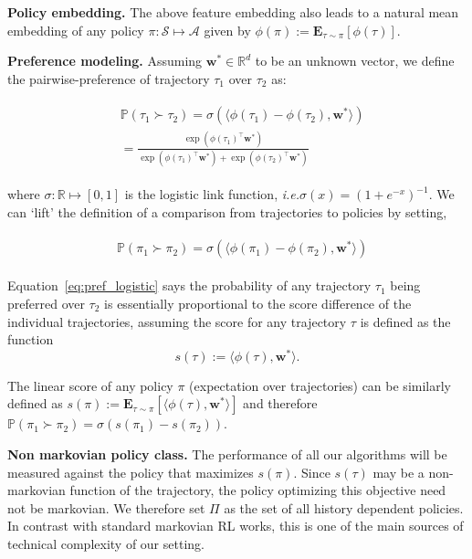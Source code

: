 \textbf{Policy embedding.} The above feature embedding also leads to a natural mean embedding of any policy $\pi: {\mathcal S} \mapsto {\mathcal A}$ given by $\phi(\pi):={\mathbf E}_{\tau \sim \pi}[\phi(\tau)]$.

\textbf{Preference modeling.} Assuming ${\mathbf w}^* \in {\mathbb R}^d$ to be an unknown vector, we define the pairwise-preference of trajectory $\tau_1$ over $\tau_2$ as:

\begin{align}
\begin{split}
\label{eq:pref_logistic}
 & \mathbb{P}( \tau_1 \succ  \tau_2 )  = \sigma( \langle \phi(\tau_1) - \phi(\tau_2), {\mathbf w}^* \rangle )  \\
 & = \frac{\exp(\phi(\tau_1)^\top {\mathbf w}^*)}{\exp(\phi(\tau_1)^\top {\mathbf w}^*) + \exp(\phi(\tau_2)^\top {\mathbf w}^*)} 
 \end{split}
\end{align}

where $\sigma: {\mathbb R} \mapsto [0,1]$ is the logistic link function, \emph{i.e.}$\sigma(x) = (1+e^{-x})^{-1}$. We can `lift' the definition of a comparison from trajectories to policies by setting,

\begin{align}
\begin{split}
\label{eq:pref_logistic_policies}
 & \mathbb{P}( \pi_1 \succ  \pi_2 )  = \sigma( \langle \phi(\pi_1) - \phi(\pi_2), {\mathbf w}^* \rangle ) 
 \end{split}
\end{align}

Equation~\ref{eq:pref_logistic} says the probability of any trajectory $\tau_1$ being preferred over $\tau_2$ is essentially proportional to the score difference of the individual trajectories, assuming the score for any trajectory $\tau$ is defined as the function \[s(\tau):= \langle \phi(\tau),{\mathbf w}^*\rangle.\] 

The linear score of any policy $\pi$ (expectation over trajectories) can be similarly defined as $s(\pi):= {\mathbf E}_{\tau \sim \pi}[\langle \phi(\tau),{\mathbf w}^*\rangle]$ and therefore $\mathbb{P}( \pi_1 \succ  \pi_2  ) = \sigma(  s(\pi_1) - s(\pi_2))$.

\textbf{Non markovian policy class. }The performance of all our algorithms will be measured against the policy that maximizes $s(\pi)$. Since $s(\tau) $ may be a non-markovian function of the trajectory, the policy optimizing this objective need not be markovian. We therefore set $\Pi$ as the set of all history dependent policies. In contrast with standard markovian RL works, this is one of the main sources of technical complexity of our setting.

